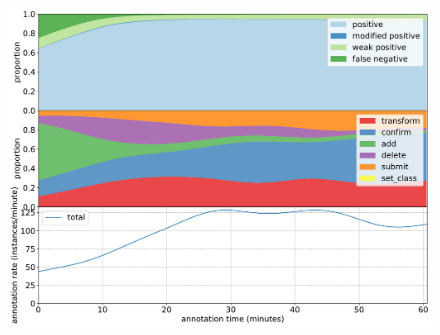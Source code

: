\begin{figure}[!h]
\centering
\includegraphics[width=1.0\linewidth]{charts/aerial_penguins/action_annotations/cotter_a.pdf}
\caption{  }
\label{fig:cotter_annotation}
\end{figure}

